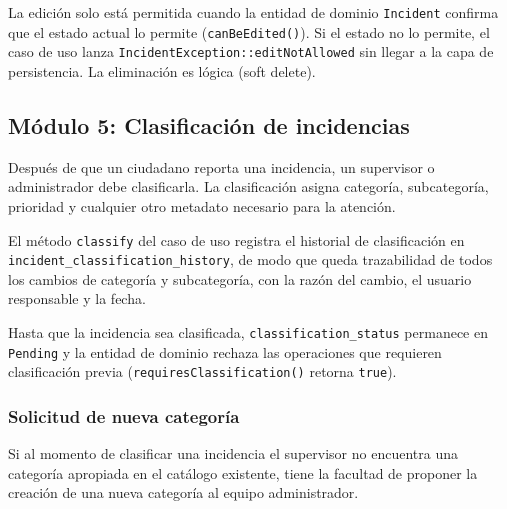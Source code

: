 \documentclass[12pt,a4paper]{article}
\begin{document}
La edición solo está permitida cuando la entidad de dominio \texttt{Incident}
confirma que el estado actual lo permite (\texttt{canBeEdited()}). Si el estado
no lo permite, el caso de uso lanza \texttt{IncidentException::editNotAllowed}
sin llegar a la capa de persistencia. La eliminación es lógica (soft delete).

\subsection{Módulo 5: Clasificación de incidencias}

Después de que un ciudadano reporta una incidencia, un supervisor o administrador
debe clasificarla. La clasificación asigna categoría, subcategoría, prioridad
y cualquier otro metadato necesario para la atención.

El método \texttt{classify} del caso de uso registra el historial de clasificación
en \texttt{incident\_classification\_history}, de modo que queda trazabilidad de
todos los cambios de categoría y subcategoría, con la razón del cambio, el usuario
responsable y la fecha.

Hasta que la incidencia sea clasificada, \texttt{classification\_status} permanece
en \texttt{Pending} y la entidad de dominio rechaza las operaciones que requieren
clasificación previa (\texttt{requiresClassification()} retorna \texttt{true}).

\subsubsection*{Solicitud de nueva categoría}

Si al momento de clasificar una incidencia el supervisor no encuentra una categoría
apropiada en el catálogo existente, tiene la facultad de proponer la creación de
una nueva categoría al equipo administrador.
\end{document}
